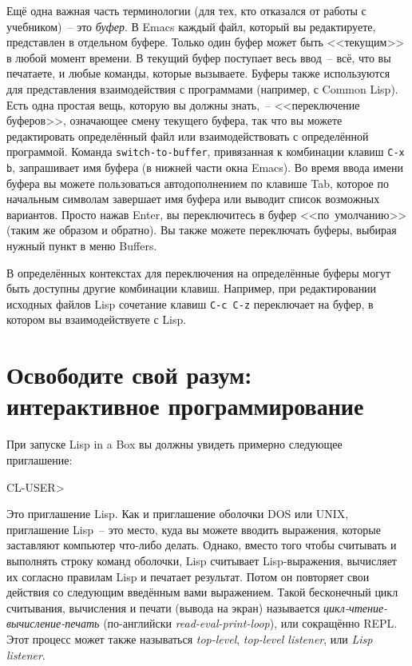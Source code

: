 Ещё одна важная часть терминологии (для тех, кто отказался от работы с учебником)~-- это
\emph{буфер}. В Emacs каждый файл, который вы редактируете, представлен в
отдельном буфере. Только один буфер может быть <<текущим>> в любой момент времени. В текущий
буфер поступает весь ввод~-- всё, что вы печатаете, и любые команды, которые
вызываете. Буферы также используются для представления взаимодействия с программами
(например, с Common Lisp). Есть одна простая вещь, которую вы должны знать,~-- <<переключение
буферов>>, означающее смену текущего буфера, так что вы можете редактировать определённый
файл или взаимодействовать с определённой программой. Команда \texttt{switch-to-buffer},
привязанная к комбинации клавиш \texttt{C-x b}, запрашивает имя буфера (в нижней части окна
Emacs). Во время ввода имени буфера вы можете пользоваться автодополнением по клавише
Tab, которое по начальным символам завершает имя буфера или выводит список возможных
вариантов. Просто нажав Enter, вы переключитесь в буфер <<по~умолчанию>> (таким же образом и
обратно). Вы также можете переключать буферы, выбирая нужный пункт в меню Buffers.

В определённых контекстах для переключения на определённые буферы могут быть доступны
другие комбинации клавиш. Например, при редактировании исходных файлов Lisp сочетание
клавиш \texttt{C-c C-z} переключает на буфер, в котором вы вза\-и\-мо\-дей\-ству\-е\-те с Lisp.

\section{Освободите свой разум: интерактивное программирование}

При запуске Lisp in a Box вы должны увидеть примерно следующее приглашение:

\begin{myverb}
CL-USER>
\end{myverb}

Это приглашение Lisp. Как и приглашение оболочки DOS или UNIX, приглашение Lisp~-- это
место, куда вы можете вводить выражения, которые заставляют компьютер что-либо делать.
Однако, вместо того чтобы считывать и выполнять строку команд оболочки, Lisp
считывает Lisp-выражения, вычисляет их согласно правилам Lisp и печатает результат. Потом
он повторяет свои действия со следующим введённым вами выражением. Такой бесконечный цикл
считывания, вычисления и печати (вывода на экран) называется
\emph{цикл-чтение-вычисление-печать} (по-английски \emph{read-eval-print-loop}), или
сокращённо REPL. Этот процесс может также называться \emph{top-level},
\emph{top-level listener}, или \emph{Lisp listener}.


